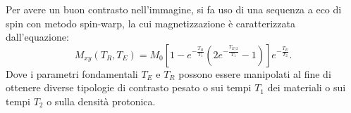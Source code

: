 Per avere un buon contrasto nell'immagine, si fa uso di una sequenza a eco di spin con metodo spin-warp, la cui magnetizzazione è caratterizzata dall'equazione:
\begin{equation}
	M_{xy}{(T_R,T_E)} = M_0[1-e^{-\frac{T_R}{T_1}}(2e^{-\frac{T_{E/2}}{T_1}}-1)]e^{-\frac{T_E}{T_2}} .
\label{fm:sw}
\end{equation}
Dove i parametri fondamentali $T_E$ e $T_R$ possono essere manipolati al fine di ottenere diverse tipologie di contrasto pesato o sui tempi $T_1$ dei materiali o sui tempi $T_2$ o sulla densità protonica.%

